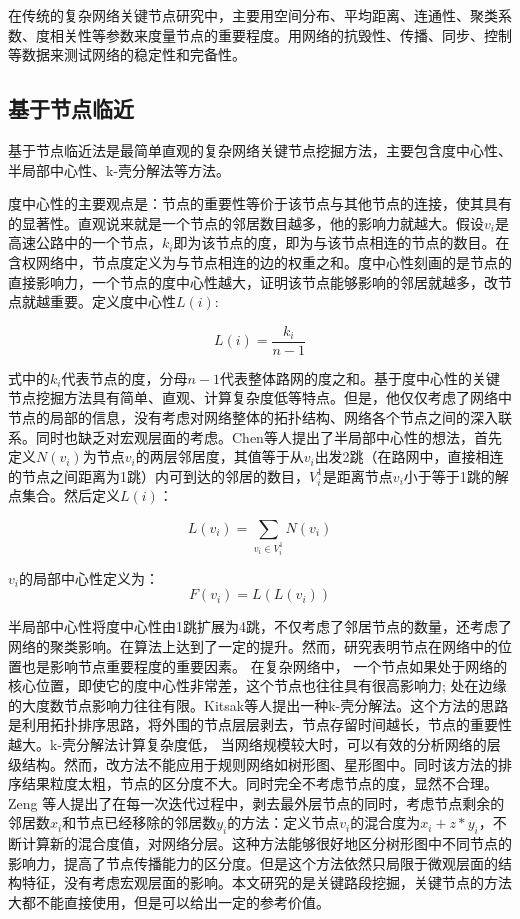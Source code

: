 	在传统的复杂网络关键节点研究中，主要用空间分布、平均距离、连通性、聚类系数、度相关性等参数来度量节点的重要程度。用网络的抗毁性、传播、同步、控制等数据来测试网络的稳定性和完备性。
				
	\subsection{基于节点临近}
		基于节点临近法是最简单直观的复杂网络关键节点挖掘方法，主要包含度中心性、半局部中心性、k-壳分解法等方法。

		度中心性的主要观点是：节点的重要性等价于该节点与其他节点的连接，使其具有的显著性。直观说来就是一个节点的邻居数目越多，他的影响力就越大\parencite{Phillip1972Factoring}。假设$v_i$是高速公路中的一个节点，$k_i$即为该节点的度，即为与该节点相连的节点的数目。在含权网络中，节点度定义为与节点相连的边的权重之和。度中心性刻画的是节点的直接影响力，一个节点的度中心性越大，证明该节点能够影响的邻居就越多，改节点就越重要。定义度中心性$L(i)$:

		$$L(i)=\frac{k_i}{n-1}$$

		式中的$k_i$代表节点的度，分母$n-1$代表整体路网的度之和。基于度中心性的关键节点挖掘方法具有简单、直观、计算复杂度低等特点。但是，他仅仅考虑了网络中节点的局部的信息，没有考虑对网络整体的拓扑结构、网络各个节点之间的深入联系。同时也缺乏对宏观层面的考虑。Chen等人提出了半局部中心性的想法\parencite{Chen2012Identifying}，首先定义$N(v_i)$为节点$v_i$的两层邻居度，其值等于从$v_i$出发2跳（在路网中，直接相连的节点之间距离为1跳）内可到达的邻居的数目，$V_i^1$是距离节点$v_i$小于等于1跳的解点集合。然后定义$L(i)$：

		$$L(v_i)=\sum\limits_{v_i \in V_i^1} N(v_i)$$

		$v_i$的局部中心性定义为：
			$$F(v_i)=L(L(v_i))$$

		半局部中心性将度中心性由1跳扩展为4跳，不仅考虑了邻居节点的数量，还考虑了网络的聚类影响。在算法上达到了一定的提升。然而，研究表明节点在网络中的位置也是影响节点重要程度的重要因素。 在复杂网络中， 一个节点如果处于网络的核心位置，即使它的度中心性非常差，这个节点也往往具有很高影响力; 处在边缘的大度数节点影响力往往有限。Kitsak等人提出一种k-壳分解法\parencite{Kitsak2010Identification}。这个方法的思路是利用拓扑排序思路，将外围的节点层层剥去，节点存留时间越长，节点的重要性越大。k-壳分解法计算复杂度低， 当网络规模较大时，可以有效的分析网络的层级结构。然而，改方法不能应用于规则网络如树形图、星形图中。同时该方法的排序结果粒度太粗，节点的区分度不大。同时完全不考虑节点的度，显然不合理。Zeng 等人提出了在每一次迭代过程中，剥去最外层节点的同时，考虑节点剩余的邻居数$x_i$和节点已经移除的邻居数$y_i$的方法\parencite{Zeng2012Ranking}：定义节点$v_i$的混合度为$x_i+z*y_i$，不断计算新的混合度值，对网络分层。这种方法能够很好地区分树形图中不同节点的影响力，提高了节点传播能力的区分度。但是这个方法依然只局限于微观层面的结构特征，没有考虑宏观层面的影响。本文研究的是关键路段挖掘，关键节点的方法大都不能直接使用，但是可以给出一定的参考价值。
			

